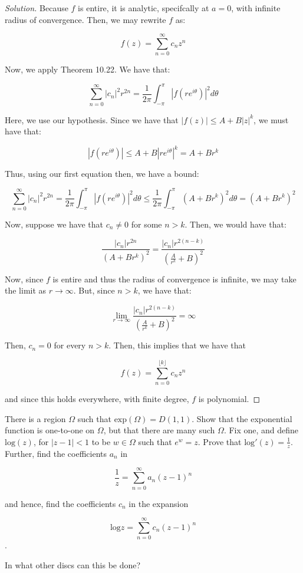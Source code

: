 \documentclass[10pt]{article}
\newenvironment{problem}[2][]{\begin{trivlist}
\item[\hskip \labelsep {\bfseries #1}\hskip \labelsep {\bfseries #2.}]}{\end{trivlist}}
\begin{document}
\begin{proof}[Solution]

Because $f$ is entire, it is analytic, specifcally at $a = 0$, with infinite radius of convergence. Then, we may rewrite $f$ as:

$$f(z) = \sum_{n=0}^\infty c_n z^n $$

Now, we apply Theorem 10.22. We have that:

$$ \sum_{n=0}^\infty |c_n |^2 r^{2n} = \frac{1}{2\pi} \int_{-\pi}^\pi | f(re^{i\theta})|^2 d\theta $$

Here, we use our hypothesis. Since we have that $ | f(z) | \leq A + B|z|^k$, we must have that:

$$ |f(r e^{i\theta}) | \leq A + B |re^{i\theta}|^k = A + Br^k$$

Thus, using our first equation then, we have a bound:

$$  \sum_{n=0}^\infty |c_n |^2 r^{2n}  = \frac{1}{2\pi} \int_{-\pi}^\pi | f(re^{i\theta})|^2 d\theta \leq  \frac{1}{2\pi} \int_{-\pi}^\pi (A + Br^k)^2 d\theta = (A + Br^k)^2 $$

Now, suppose we have that $c_n \not = 0$ for some $n > k$. Then, we would have that:

$$\frac{|c_n| r^{2n}}{(A + Br^k)^2} = \frac{|c_n| r^{2(n - k)}}{(\frac{A}{r^k} + B)^2}$$

Now, since $f$ is entire and thus the radius of convergence is infinite,  we may take the limit as $r \to \infty$. But, since $n > k$, we have that:

$$ \lim_{r \to \infty} \frac{|c_n| r^{2(n - k)}}{(\frac{A}{r^k} + B)^2} = \infty$$

Then, $c_n = 0$ for every $n > k$. Then, this implies that we have that

$$ f(z) = \sum_{n=0}^{ \lfloor k \rfloor } c_n z^n $$

and since this holds everywhere, with finite degree, $f$ is polynomial.

\end{proof}

\begin{problem}{Question 6}
There is a region $\Omega$ such that $\text{exp}(\Omega) = D(1,1)$. Show that the exponential function is one-to-one on $\Omega$, but that there are many such $\Omega$. Fix one, and define $\text{log}(z)$, for $|z-1| < 1$ to be $w \in \Omega$ such that $e^w = z$. Prove that $\text{log}'(z) = \frac{1}{z}$. Further, find the coefficients $a_n$ in

$$ \frac{1}{z} = \sum_{n=0}^\infty a_n(z-1)^n$$

and hence, find the coefficients $c_n$ in the expansion

$$ \text{log} z = \sum_{n=0}^\infty c_n (z-1)^n$$.

In what other discs can this be done?
\end{problem}
\end{document}
